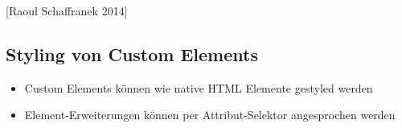 \begin{Shaded}
\begin{Highlighting}[]
 \OperatorTok{=} \NormalTok{(}\NormalTok{)}\OperatorTok{;}

 \OperatorTok{=} \NormalTok{() }\OperatorTok{\{}\OperatorTok{\};}
 \OperatorTok{=} \NormalTok{() }\OperatorTok{\{}\OperatorTok{\};}

 \OperatorTok{=} \NormalTok{(}\OperatorTok{,} \OperatorTok{\{}\OperatorTok{:} \OperatorTok{\}}\NormalTok{)}\OperatorTok{;}
\end{Highlighting}
\end{Shaded}

{[}Raoul Schaffranek 2014{]}

\subsection{Styling von Custom
Elements}\label{styling-von-custom-elements}

\begin{itemize}
\tightlist
\item
  Custom Elements können wie native HTML Elemente gestyled werden
\end{itemize}

\begin{Shaded}
\begin{Highlighting}[]
\KeywordTok{\{}
   \KeywordTok{;}
\KeywordTok{\}}
\end{Highlighting}
\end{Shaded}

\begin{itemize}
\tightlist
\item
  Element-Erweiterungen können per Attribut-Selektor angesprochen werden
\end{itemize}

\begin{Shaded}
\begin{Highlighting}[]
\CharTok{[is=}\CharTok{]} \KeywordTok{\{}
   \KeywordTok{;}
\KeywordTok{\}}
\end{Highlighting}
\end{Shaded}

